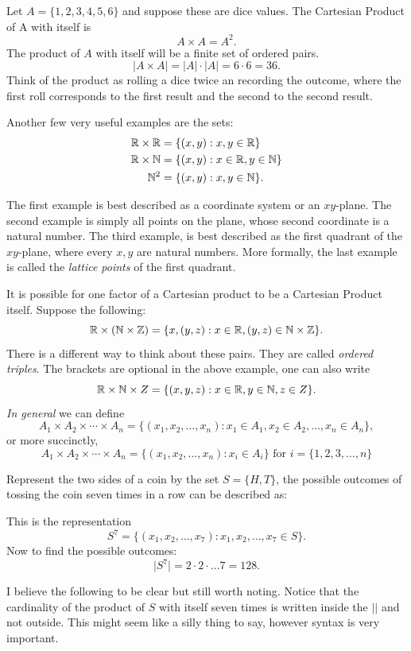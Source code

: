 \begin{example}
    Let $A=\{1,2,3,4,5,6\}$ and suppose these are dice values. The Cartesian Product of A with itself is 
    $$
    A\times A = A^{2}.
    $$
The product of $A$ with itself will be a finite set of ordered pairs. 
$$
\lvert A\times A \rvert = \lvert A \rvert \cdot \lvert A \rvert= 6\cdot 6 = 36.
$$
Think of the product as rolling a dice twice an recording the outcome, where the first roll corresponds to the first result and the second to the second result. 

\begin{example}
Another few very useful examples are the sets: 
$$
\begin{aligned}
\mathbb{R} \times \mathbb{R} &= \{(x,y): x,y \in \mathbb{R}\}\\
\mathbb{R} \times \mathbb{N} &= \{(x,y): x\in \mathbb{R}, y\in \mathbb{N}\}\\
\mathbb{N}^{2} &= \{(x,y): x,y\in \mathbb{N}\}. 
\end{aligned}
$$
\end{example}
The first example is best described as a coordinate system or an $xy$-plane. The second example is simply all points on the plane, whose second coordinate is a natural number. The third example, is best described as the first quadrant of the $xy$-plane, where every $x,y$ are natural numbers. More formally, the last example is called the \emph{lattice points} of the first quadrant. 
\end{example}

It is possible for one factor of a Cartesian product to be a Cartesian Product itself. Suppose the following: 
$$
\mathbb{R} \times (\mathbb{N} \times \mathbb{Z}) =\{x, (y,z): x\in \mathbb{R}, (y,z)\in \mathbb{N}\times \mathbb{Z}\}.
$$
There is a different way to think about these pairs. They are called \emph{ordered triples}. 
The brackets are optional in the above example, one can also write 
$$
\mathbb{R} \times \mathbb{N} \times Z = \{(x,y,z): x\in \mathbb{R}, y\in \mathbb{N}, z\in Z\}.
$$
\emph{In general} we can define 
$$
A_{1}\times A_2\times \cdots \times A_n =\{(x_1,x_2,\dots,x_n): x_1\in A_1,x_2\in A_2,\dots,x_n\in A_n\},
$$
or more succinctly, 
$$
A_{1}\times A_2 \times \cdots \times A_n =\{(x_1,x_2,\dots,x_n): x_i\in A_i\} \text{ for } i=\{1,2,3,\dots,n\}
$$

\begin{example}
    Represent the two sides of a coin by the set $S=\{ H,T \}$, the possible outcomes of tossing the coin seven times in a row can be described as: 
    \begin{solution}
        This is the representation
        $$
        S^7=\{(x_1,x_2,\dots,x_7): x_1,x_2,\dots,x_7 \in S\}.
        $$
        Now to find the possible outcomes: 
        $$
        \lvert S^7 \rvert = 2 \cdot 2 \cdot \dots 7= 128.
        $$
    \end{solution}
\end{example}
I believe the following to be clear but still worth noting. Notice that the cardinality of the product of $S$ with itself seven times is written inside the $\lvert  \rvert$ and not outside. This might seem like a silly thing to say, however syntax is very important. 

